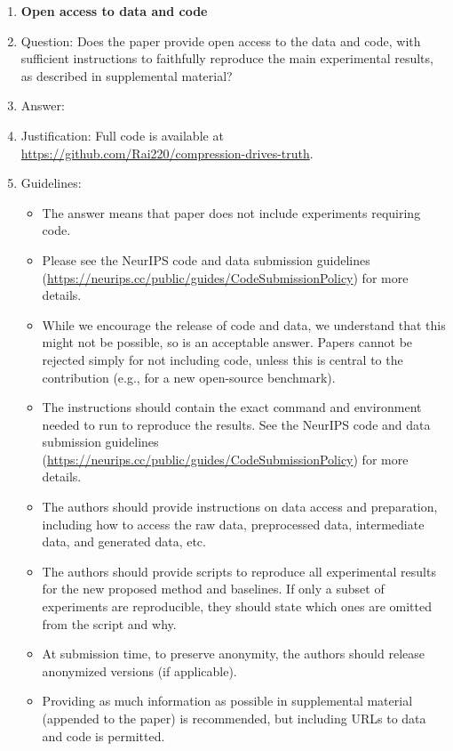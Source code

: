 \documentclass{article}
\begin{document}
\begin{enumerate}
\item {\bf Open access to data and code}
    \item[] Question: Does the paper provide open access to the data and code, with sufficient instructions to faithfully reproduce the main experimental results, as described in supplemental material?
    \item[] Answer: \answerYes{}
    \item[] Justification: Full code is available at \url{https://github.com/Rai220/compression-drives-truth}.
    \item[] Guidelines:
    \begin{itemize}
        \item The answer \answerNA{} means that paper does not include experiments requiring code.
        \item Please see the NeurIPS code and data submission guidelines (\url{https://neurips.cc/public/guides/CodeSubmissionPolicy}) for more details.
        \item While we encourage the release of code and data, we understand that this might not be possible, so \answerNo{} is an acceptable answer. Papers cannot be rejected simply for not including code, unless this is central to the contribution (e.g., for a new open-source benchmark).
        \item The instructions should contain the exact command and environment needed to run to reproduce the results. See the NeurIPS code and data submission guidelines (\url{https://neurips.cc/public/guides/CodeSubmissionPolicy}) for more details.
        \item The authors should provide instructions on data access and preparation, including how to access the raw data, preprocessed data, intermediate data, and generated data, etc.
        \item The authors should provide scripts to reproduce all experimental results for the new proposed method and baselines. If only a subset of experiments are reproducible, they should state which ones are omitted from the script and why.
        \item At submission time, to preserve anonymity, the authors should release anonymized versions (if applicable).
        \item Providing as much information as possible in supplemental material (appended to the paper) is recommended, but including URLs to data and code is permitted.
    \end{itemize}



\end{enumerate}
\end{document}
